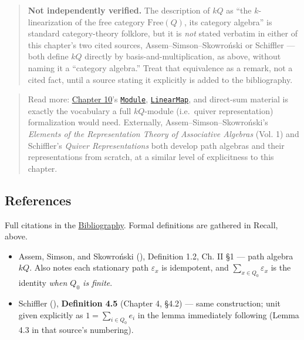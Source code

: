 \begin{quote}
\textbf{Not independently verified.} The description of \(kQ\) as ``the \(k\)-linearization of the free category \(\mathrm{Free}(Q)\), its category algebra'' is standard category-theory folklore, but it is \emph{not} stated verbatim in either of this chapter's two cited sources, Assem--Simson--Skowroński or Schiffler --- both define \(kQ\) directly by basis-and-multiplication, as above, without naming it a ``category algebra.'' Treat that equivalence as a remark, not a cited fact, until a source stating it explicitly is added to the bibliography.
\end{quote}

\begin{quote}
Read more: \hyperref[sec:10-modules:00-index:1]{Chapter 10}'s \href{https://loogle.lean-lang.org/?q=Module}{\texttt{Module}}, \href{https://loogle.lean-lang.org/?q=LinearMap}{\texttt{LinearMap}}, and direct-sum material is exactly the vocabulary a full \(kQ\)-module (i.e.~quiver representation) formalization would need. Externally, Assem--Simson--Skowroński's \emph{Elements of the Representation Theory of Associative Algebras} (Vol. 1) and Schiffler's \emph{Quiver Representations} both develop path algebras and their representations from scratch, at a similar level of explicitness to this chapter.
\end{quote}

\subsection{References}\label{sec:11-path-algebras:05-path-composition:5}

Full citations in the \hyperref[sec:root:bibliography:1]{Bibliography}. Formal definitions are gathered in Recall, above.

\begin{itemize}
\tightlist
\item
  Assem, Simson, and Skowroński (\cite{AssemSimsonSkowronski2006}), Definition 1.2, Ch. II §1 --- path algebra \(kQ\). Also notes each stationary path \(\varepsilon_x\) is idempotent, and \(\sum_{x\in Q_0}\varepsilon_x\) is the identity \emph{when \(Q_0\) is finite}.
\item
  Schiffler (\cite{Schiffler2014}), \textbf{Definition 4.5} (Chapter 4, §4.2) --- same construction; unit given explicitly as \(1 = \sum_{i\in Q_0} e_i\) in the lemma immediately following (Lemma 4.3 in that source's numbering).
\end{itemize}
